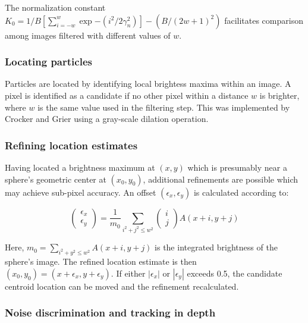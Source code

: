 The normalization constant $K_0 = 1/B[\sum_{i=-w}^w \exp{-(i^2/2\gamma_n^2)}] - (B/(2w+1)^2)$ facilitates comparison
among images filtered with different values of $w$.

\subsubsection{Locating particles}

Particles are located by identifying local brightess maxima within an image. A pixel is identified
as a candidate if no other pixel within a distance $w$ is brighter, where $w$ is the same value used in
the filtering step. This was implemented by Crocker and Grier using a gray-scale dilation operation.

\subsubsection{Refining location estimates}

Having located a brightness maximum at $(x, y)$ which is presumably near
a sphere's geometric center at $(x_0, y_0)$, additional refinements are possible
which may achieve sub-pixel accuracy.  An offset $(\epsilon_x, \epsilon_y)$ is
calculated according to:

\begin{center}
\begin{equation}
\left( \begin{array}{c} \epsilon_x \\ \epsilon_y \end{array} \right) 
= \frac{1}{m_0}
\sum_{i^2+j^2 \leq w^2} 
\left( \begin{array}{c} i \\ j \end{array} \right)
A(x+i,y+j)
\end{equation}
\end{center}

Here, $m_0 = \sum_{i^2+y^2 \leq w^2} A(x+i,y+j)$ is the integrated brightness of the
sphere's image. The refined location estimate is then $(x_0, y_0) = (x+\epsilon_x, y+\epsilon_y)$.
If either $|\epsilon_x|$ or $|\epsilon_y|$ exceeds 0.5, the candidate centroid location can be moved and the
refinement recalculated.

\subsubsection{Noise discrimination and tracking in depth}

